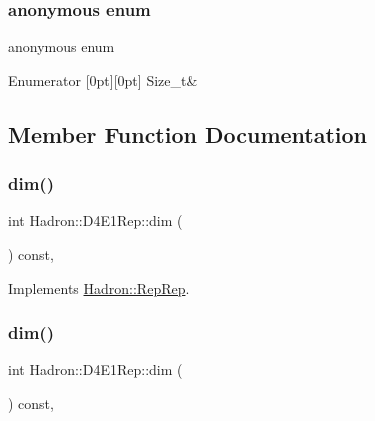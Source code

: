 \subsubsection{\texorpdfstring{anonymous enum}{anonymous enum}}
{\footnotesize\ttfamily anonymous enum}

\begin{DoxyEnumFields}{Enumerator}
[0pt][0pt]{}\mbox{\label{structHadron_1_1D4E1Rep_a8b3ccd5c8cb82d4e087586c990b3e111a5a5bf56aa9c80673f52ab509934901f7}} 
Size\+\_\+t&\\
\hline

\end{DoxyEnumFields}


\subsection{Member Function Documentation}
\mbox{\label{structHadron_1_1D4E1Rep_a4e11b2eaec3c949ef3d8b7c391078e84}} 
\subsubsection{\texorpdfstring{dim()}{dim()}\hspace{0.1cm}{\footnotesize\ttfamily [1/5]}}
{\footnotesize\ttfamily int Hadron\+::\+D4\+E1\+Rep\+::dim (\begin{DoxyParamCaption}{ }\end{DoxyParamCaption}) const\hspace{0.3cm}{\ttfamily [inline]}, {\ttfamily [virtual]}}



Implements \mbox{\hyperlink{structHadron_1_1RepRep_a92c8802e5ed7afd7da43ccfd5b7cd92b}{Hadron\+::\+Rep\+Rep}}.

\mbox{\label{structHadron_1_1D4E1Rep_a4e11b2eaec3c949ef3d8b7c391078e84}} 
\subsubsection{\texorpdfstring{dim()}{dim()}\hspace{0.1cm}{\footnotesize\ttfamily [2/5]}}
{\footnotesize\ttfamily int Hadron\+::\+D4\+E1\+Rep\+::dim (\begin{DoxyParamCaption}{ }\end{DoxyParamCaption}) const\hspace{0.3cm}{\ttfamily [inline]}, {\ttfamily [virtual]}}



